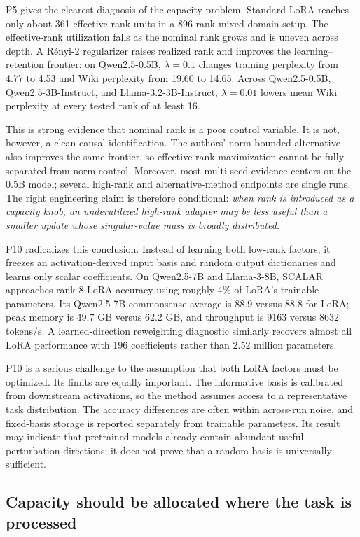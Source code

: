 \documentclass[11pt]{article}
\newcommand{\method}[1]{\textsc{#1}}
\begin{document}
P5 gives the clearest diagnosis of the capacity problem. Standard LoRA reaches only about 361 effective-rank units in a 896-rank mixed-domain setup. The effective-rank utilization falls as the nominal rank grows and is uneven across depth. A Rényi-2 regularizer raises realized rank and improves the learning--retention frontier: on Qwen2.5-0.5B, $\lambda=0.1$ changes training perplexity from 4.77 to 4.53 and Wiki perplexity from 19.60 to 14.65. Across Qwen2.5-0.5B, Qwen2.5-3B-Instruct, and Llama-3.2-3B-Instruct, $\lambda=0.01$ lowers mean Wiki perplexity at every tested rank of at least 16.

This is strong evidence that nominal rank is a poor control variable. It is not, however, a clean causal identification. The authors' norm-bounded alternative also improves the same frontier, so effective-rank maximization cannot be fully separated from norm control. Moreover, most multi-seed evidence centers on the 0.5B model; several high-rank and alternative-method endpoints are single runs. The right engineering claim is therefore conditional: \emph{when rank is introduced as a capacity knob, an underutilized high-rank adapter may be less useful than a smaller update whose singular-value mass is broadly distributed.}

P10 radicalizes this conclusion. Instead of learning both low-rank factors, it freezes an activation-derived input basis and random output dictionaries and learns only scalar coefficients. On Qwen2.5-7B and Llama-3-8B, \method{SCALAR} approaches rank-8 LoRA accuracy using roughly 4\% of LoRA's trainable parameters. Its Qwen2.5-7B commonsense average is 88.9 versus 88.8 for LoRA; peak memory is 49.7 GB versus 62.2 GB, and throughput is 9163 versus 8632 tokens/s. A learned-direction reweighting diagnostic similarly recovers almost all LoRA performance with 196 coefficients rather than 2.52 million parameters.

P10 is a serious challenge to the assumption that both LoRA factors must be optimized. Its limits are equally important. The informative basis is calibrated from downstream activations, so the method assumes access to a representative task distribution. The accuracy differences are often within across-run noise, and fixed-basis storage is reported separately from trainable parameters. Its result may indicate that pretrained models already contain abundant useful perturbation directions; it does not prove that a random basis is universally sufficient.

\subsection{Capacity should be allocated where the task is processed}
\end{document}

